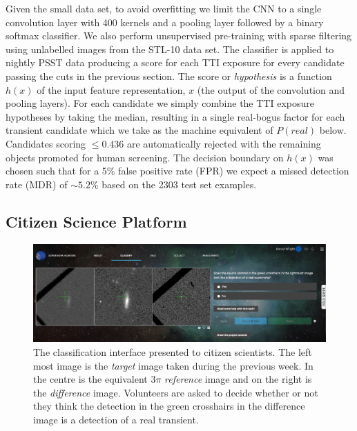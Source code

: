 \documentclass[a4paper,fleqn,usenatbib]{mnras}
\begin{document}
Given the small data set, to avoid overfitting we limit the CNN to a single convolution layer with 400 kernels and a pooling layer followed by a binary softmax classifier.  We also perform unsupervised pre-training with sparse filtering \citep{Ngiam11} using unlabelled images from the STL-10 \citep{Coates11} data set.  The classifier is applied to nightly PSST data producing a score for each TTI exposure for every candidate passing the cuts in the previous section.  The score or \textit{hypothesis} is a function $h(x)$ of the input feature representation, $x$ (the output of the convolution and pooling layers).  For each candidate we simply combine the TTI exposure hypotheses by taking the median, resulting in a single real-bogus factor for each transient candidate which we take as the machine equivalent of $P(real)$ below.  Candidates scoring $\leq 0.436$ are automatically rejected with the remaining objects promoted for human screening.  The decision boundary on $h(x)$ was chosen such that for a 5\% false positive rate (FPR) we expect a missed detection rate (MDR) of $\sim5.2$\% based on
the 2303 test set examples.

\subsection{Citizen Science Platform}


\begin{figure}
   \begin{minipage}{140mm}
   \includegraphics[width=140mm]{figs/sn_hunters.png}
   \caption{The classification interface presented to citizen scientists.  The left most image is the \textit{target} image taken during the previous week.  In the centre is the equivalent $3\pi$ \textit{reference} image and on the right is the \textit{difference} image.  Volunteers are asked to decide whether or not they think the detection in the green crosshairs in the difference image is a
detection of a real transient.}
   \label{fig:sn_hunters}
   \end{minipage}
\end{figure}
\end{document}
